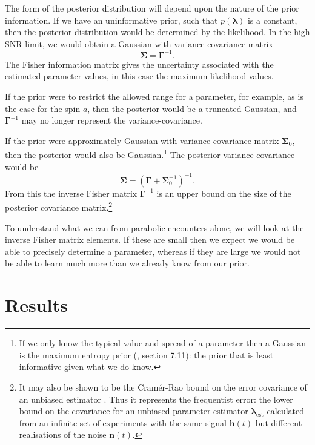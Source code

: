 \documentclass[useAMS,usedcolumn,usegraphicx,usenatbib]{mn2e}
\newcommand{\sub}[1]{\ensuremath{_\mathrm{#1}}}
\begin{document}
The form of the posterior distribution will depend upon the nature of the prior information. If we have an uninformative prior, such that $p(\boldsymbol{\lambda})$ is a constant, then the posterior distribution would be determined by the likelihood. In the high SNR limit, we would obtain a Gaussian with variance-covariance matrix
\begin{equation}
\boldsymbol{\Sigma} = \boldsymbol{\Gamma}^{-1}.
\label{eq:InvFisher}
\end{equation}
The Fisher information matrix gives the uncertainty associated with the estimated parameter values, in this case the maximum-likelihood values.

If the prior were to restrict the allowed range for a parameter, for example, as is the case for the spin $a$, then the posterior would be a truncated Gaussian, and $\boldsymbol{\Gamma}^{-1}$ may no longer represent the variance-covariance.

If the prior were approximately Gaussian with variance-covariance matrix $\boldsymbol{\Sigma}_0$, then the posterior would also be Gaussian.\footnote{If we only know the typical value and spread of a parameter then a Gaussian is the maximum entropy prior (\citealt{Jaynes2003}, section 7.11): the prior that is least informative given what we do know.} The posterior variance-covariance would be \citep{Cutler1994, Vallisneri2008}
\begin{equation}
\boldsymbol{\Sigma} = \left(\boldsymbol{\Gamma} + \boldsymbol{\Sigma}_0^{-1}\right)^{-1}.
\label{eq:Posterior_variance}
\end{equation}
From this the inverse Fisher matrix $\boldsymbol{\Gamma}^{-1}$ is an upper bound on the size of the posterior covariance matrix.\footnote{It may also be shown to be the Cram\'{e}r-Rao bound on the error covariance of an unbiased estimator \citep{Cutler1994, Vallisneri2008}. Thus it represents the frequentist error: the lower bound on the covariance for an unbiased parameter estimator $\boldsymbol{\lambda}\sub{est}$ calculated from an infinite set of experiments with the same signal $\boldsymbol{h}(t)$ but different realisations of the noise $\boldsymbol{n}(t)$.}

To understand what we can from parabolic encounters alone, we will look at the inverse Fisher matrix elements. If these are small then we expect we would be able to precisely determine a parameter, whereas if they are large we would not be able to learn much more than we already know from our prior.

\section{Results}
\end{document}
